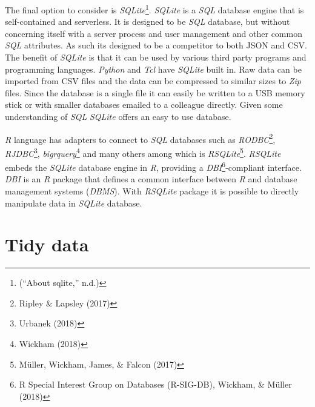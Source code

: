 \documentclass[12pt,oneside]{reedthesis}
\theoremstyle{definition}
\theoremstyle{definition}
\theoremstyle{definition}
\theoremstyle{remark}
\begin{document}
The final option to consider is \emph{SQLite}\footnote{(``About
  sqlite,'' n.d.)}. \emph{SQLite} is a \emph{SQL} database engine that
is self-contained and serverless. It is designed to be \emph{SQL}
database, but without concerning itself with a server process and user
management and other common \emph{SQL} attributes. As such its designed
to be a competitor to both JSON and CSV. The benefit of \emph{SQLite} is
that it can be used by various third party programs and programming
languages. \emph{Python} and \emph{Tcl} have \emph{SQLite} built in. Raw
data can be imported from CSV files and the data can be compressed to
similar sizes to \emph{Zip} files. Since the database is a single file
it can easily be written to a USB memory stick or with smaller databases
emailed to a colleague directly. Given some understanding of \emph{SQL}
\emph{SQLite} offers an easy to use database.

\emph{R} language has adapters to connect to \emph{SQL} databases such
as \emph{RODBC}\footnote{Ripley \& Lapsley (2017)},
\emph{RJDBC}\footnote{Urbanek (2018)}, \emph{bigrquery}\footnote{Wickham
  (2018)} and many others among which is \emph{RSQLite}\footnote{Müller,
  Wickham, James, \& Falcon (2017)}. \emph{RSQLite} embeds the
\emph{SQLite} database engine in \emph{R}, providing a
\emph{DBI}\footnote{R Special Interest Group on Databases (R-SIG-DB),
  Wickham, \& Müller (2018)}-compliant interface. \emph{DBI} is an
\emph{R} package that defines a common interface between \emph{R} and
database management systems (\emph{DBMS}). With \emph{RSQLite} package
it is possible to directly manipulate data in \emph{SQLite} database.

\section{Tidy data}\label{tidy-data}
\end{document}
